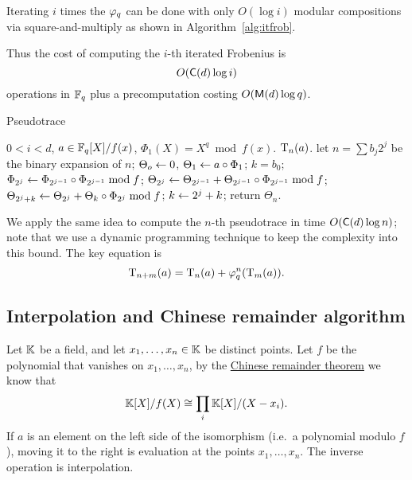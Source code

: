 Iterating $i$ times the $\varphi_q$ can be done with only $O(\log i)$
modular compositions via square-and-multiply as shown in
Algorithm~\ref{alg:itfrob}.

Thus the cost of computing the $i$-th iterated Frobenius is
\begin{equation}
  \label{eq:204}
  O(\mathsf{C}(d)\log i)
\end{equation}
operations in $\mathbb{F}_q$ plus a precomputation costing $O(\mathsf{M}(d)\log
q)$.

\begin{algorithm}
  \caption{Pseudotrace}
  \begin{algorithmic}[1]
    \REQUIRE $0<i<d$, $a\in\mathbb{F}_q[X]/f(x)$, $\Phi_1(X) = X^q\bmod f(x)$.
    \ENSURE $\operatorname{T}_n(a)$.
    \STATE let $n=\sum b_j2^j$ be the binary expansion of $n$;
    \STATE $\Theta_o \leftarrow 0$, $\Theta_1 \leftarrow a\circ\Phi_{1}$;
    \STATE $k=b_0$;
    \STATE $\Phi_{2^j} \leftarrow \Phi_{2^{j-1}}\circ\Phi_{2^{j-1}} \bmod f$;
    \STATE $\Theta_{2^j} \leftarrow \Theta_{2^{j-1}} + \Theta_{2^{j-1}}\circ\Phi_{2^{j-1}} \bmod f$;
    \STATE $\Theta_{2^j+k} \leftarrow \Theta_{2^j} + \Theta_{k}\circ\Phi_{2^j} \bmod f$;
    \STATE $k \leftarrow 2^j + k$;
    \ENDIF
    \ENDFOR
    \STATE return $\Theta_n$.
  \end{algorithmic}
\end{algorithm}

We apply the same idea to compute the $n$-th pseudotrace in time
$O(\mathsf{C}(d)\log n)$; note that we use a dynamic programming
technique to keep the complexity into this bound. The key equation is
\begin{equation}
  \label{eq:205}
  \operatorname{T}_{n+m}(a) = \operatorname{T}_{n}(a)+\varphi_q^n(\operatorname{T}_{m}(a))
  \text{.}
\end{equation}


\subsection{Interpolation and Chinese remainder algorithm}
\label{sec:chin-rema-algor}
Let $\mathbb{K}$ be a field, and let $x_1,\ldots,x_n\in\mathbb{K}$ be distinct
points. Let $f$ be the polynomial that vanishes on $x_1,\ldots,x_n$,
by the \hyperref[th:chinese-remainder]{Chinese remainder theorem}
we know that
\begin{equation}
  \label{eq:221}
  \mathbb{K}[X]/f(X) \cong\prod_i \mathbb{K}[X]/(X-x_i)
  \text{.}
\end{equation}
If $a$ is an element on the left side of the isomorphism (i.e.\ a
polynomial modulo $f$), moving it to the right is evaluation at the
points $x_1,\ldots,x_n$. The inverse operation is interpolation. 

